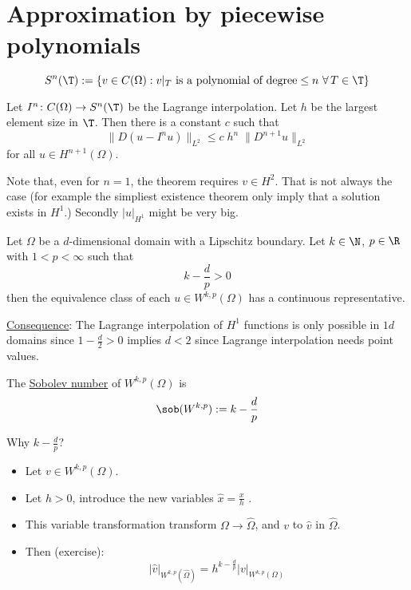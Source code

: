\chapter{Approximation by piecewise polynomials}
\begin{equation*}
	S^n(\T):= \left\{ v \in C(\Omega): v|_{T} \text{ is a polynomial of degree} \leq n \ \forall\, T \in \T \right\}
\end{equation*}
\begin{theorem}
	Let $I^n\colon C(\Omega) \to S^n(\T)$ be the Lagrange interpolation.
	Let $h$ be the largest element size in $\T$.
	Then there is a constant $c$ such that
	\begin{equation*}
		\|D(u-I^nu)\|_{L^{2}} \leq c\; h^n\; \|D^{n+1}u\|_{L^{2}}
	\end{equation*}
	for all $u \in H^{n+1}(\Omega)$.
\end{theorem}
Note that, even for  $n=1$, the theorem requires $v \in H^2$.
That is not always the case (for example the simpliest existence
theorem only imply that a solution exists in $H^1$.)
Secondly $|u|_{H^1}$ might be very big.
\begin{theorem}\enter
	Let $\Omega$ be a $d$-dimensional domain with a Lipschitz boundary.
	Let $k \in \N$, $p \in \R$ with $1 < p < \infty$ such that
	\begin{equation*}
		k-\frac{d}{p}>0
	\end{equation*}
	then the equivalence class of each $u \in W^{k,p}(\Omega)$ has a continuous representative.
\end{theorem}
\underline{Consequence}: The Lagrange interpolation of $H^1$ functions is only possible in $1d$ domains since $1 - \frac {d}{2} > 0$ implies $d < 2$ since Lagrange interpolation needs point values.
\begin{definition}
  The \underline{Sobolev number} of $W^{k,p}(\Omega)$ is
	\begin{equation*}
		\sob(W^{k,p}):= k - \frac{d}{p}
	\end{equation*}
\end{definition}
Why $k-\frac{d}{p}$?
\begin{itemize}
	\item Let $v \in W^{k,p}(\Omega)$.
	\item Let $h > 0$, introduce the new variables $\hat{x}= \frac{x}{h}$ .
	\item This variable transformation transform $\Omega \to \hat{\Omega}$, and $v$ to $\hat{v}$ in $\hat{\Omega}$.
  \item Then (exercise):
    \begin{equation*}
      |\hat{v}|_{W^{k,p}(\hat{\Omega})} = h^{k-\frac{d}{p}} |v|_{W^{k,p}(\Omega)}
    \end{equation*}
\end{itemize}
